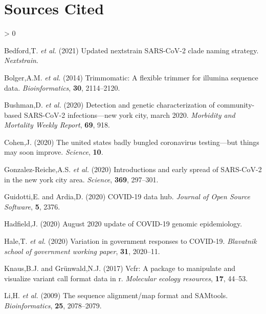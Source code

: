\documentclass[
]{article}
\newlength{\cslhangindent}
\newenvironment{CSLReferences}[2] %
 {%
  \setlength{\parindent}{0pt}
  \ifodd #1 \everypar{\setlength{\hangindent}{\cslhangindent}}\ignorespaces\fi
  \ifnum #2 > 0
  \setlength{\parskip}{#2\baselineskip}
  \fi
 }%
 {}
\begin{document}
\hypertarget{sources-cited}{%
\section*{Sources Cited}\label{sources-cited}}

\hypertarget{refs}{}
\begin{CSLReferences}{1}{0}
\leavevmode\hypertarget{ref-bedford_hodcroft_neher_2021}{}%
Bedford,T. \emph{et al.} (2021) Updated nextstrain SARS-CoV-2 clade
naming strategy. \emph{Nextstrain}.

\leavevmode\hypertarget{ref-bolger2014trimmomatic}{}%
Bolger,A.M. \emph{et al.} (2014) Trimmomatic: A flexible trimmer for
illumina sequence data. \emph{Bioinformatics}, \textbf{30}, 2114--2120.

\leavevmode\hypertarget{ref-bushman2020detection}{}%
Bushman,D. \emph{et al.} (2020) Detection and genetic characterization
of community-based SARS-CoV-2 infections---new york city, march 2020.
\emph{Morbidity and Mortality Weekly Report}, \textbf{69}, 918.

\leavevmode\hypertarget{ref-cohen2020united}{}%
Cohen,J. (2020) The united states badly bungled coronavirus
testing---but things may soon improve. \emph{Science}, \textbf{10}.

\leavevmode\hypertarget{ref-gonzalez2020introductions}{}%
Gonzalez-Reiche,A.S. \emph{et al.} (2020) Introductions and early spread
of SARS-CoV-2 in the new york city area. \emph{Science}, \textbf{369},
297--301.

\leavevmode\hypertarget{ref-Guidotti2020}{}%
Guidotti,E. and Ardia,D. (2020) COVID-19 data hub. \emph{Journal of Open
Source Software}, \textbf{5}, 2376.

\leavevmode\hypertarget{ref-hadfield_2020}{}%
Hadfield,J. (2020) August 2020 update of COVID-19 genomic epidemiology.

\leavevmode\hypertarget{ref-hale2020variation}{}%
Hale,T. \emph{et al.} (2020) Variation in government responses to
COVID-19. \emph{Blavatnik school of government working paper},
\textbf{31}, 2020--11.

\leavevmode\hypertarget{ref-knaus2017vcfr}{}%
Knaus,B.J. and Grünwald,N.J. (2017) Vcfr: A package to manipulate and
visualize variant call format data in r. \emph{Molecular ecology
resources}, \textbf{17}, 44--53.

\leavevmode\hypertarget{ref-li2009sequence}{}%
Li,H. \emph{et al.} (2009) The sequence alignment/map format and
SAMtools. \emph{Bioinformatics}, \textbf{25}, 2078--2079.


\end{CSLReferences}
\end{document}
